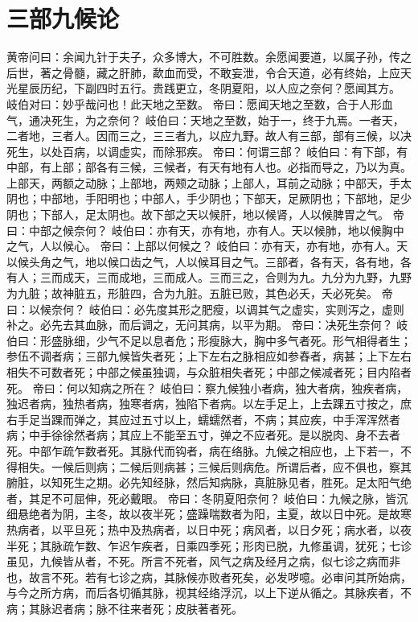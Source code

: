 \documentclass[a4paper,12pt,UTF8,twoside]{ctexbook}
\begin{document}
\chapter{三部九候论}
黄帝问曰：余闻九针于夫子，众多博大，不可胜数。余愿闻要道，以属子孙，传之后世，著之骨髓，藏之肝肺，歃血而受，不敢妄泄，令合天道，必有终始，上应天光星辰历纪，下副四时五行。贵践更立，冬阴夏阳，以人应之奈何？愿闻其方。
岐伯对曰：妙乎哉问也！此天地之至数。
帝曰：愿闻天地之至数，合于人形血气，通决死生，为之奈何？
岐伯曰：天地之至数，始于一，终于九焉。一者天，二者地，三者人。因而三之，三三者九，以应九野。故人有三部，部有三候，以决死生，以处百病，以调虚实，而除邪疾。
帝曰：何谓三部？
岐伯曰：有下部，有中部，有上部；部各有三候，三候者，有天有地有人也。必指而导之，乃以为真。上部天，两额之动脉；上部地，两颊之动脉；上部人，耳前之动脉；中部天，手太阴也；中部地，手阳明也；中部人，手少阴也；下部天，足厥阴也；下部地，足少阴也；下部人，足太阴也。故下部之天以候肝，地以候肾，人以候脾胃之气。
帝曰：中部之候奈何？
岐伯曰：亦有天，亦有地，亦有人。天以候肺，地以候胸中之气，人以候心。
帝曰：上部以何候之？
岐伯曰：亦有天，亦有地，亦有人。天以候头角之气，地以候口齿之气，人以候耳目之气。三部者，各有天，各有地，各有人；三而成天，三而成地，三而成人。三而三之，合则为九。九分为九野，九野为九脏；故神脏五，形脏四，合为九脏。五脏已败，其色必夭，夭必死矣。
帝曰：以候奈何？
岐伯曰：必先度其形之肥瘦，以调其气之虚实，实则泻之，虚则补之。必先去其血脉，而后调之，无问其病，以平为期。
帝曰：决死生奈何？
岐伯曰：形盛脉细，少气不足以息者危；形瘦脉大，胸中多气者死。形气相得者生；参伍不调者病；三部九候皆失者死；上下左右之脉相应如参舂者，病甚；上下左右相失不可数者死；中部之候虽独调，与众脏相失者死；中部之候减者死；目内陷者死。
帝曰：何以知病之所在？
岐伯曰：察九候独小者病，独大者病，独疾者病，独迟者病，独热者病，独寒者病，独陷下者病。以左手足上，上去踝五寸按之，庶右手足当踝而弹之，其应过五寸以上，蠕蠕然者，不病；其应疾，中手浑浑然者病；中手徐徐然者病；其应上不能至五寸，弹之不应者死。是以脱肉、身不去者死。中部乍疏乍数者死。其脉代而钩者，病在络脉。九候之相应也，上下若一，不得相失。一候后则病；二候后则病甚；三候后则病危。所谓后者，应不俱也，察其腑脏，以知死生之期。必先知经脉，然后知病脉，真脏脉见者，胜死。足太阳气绝者，其足不可屈伸，死必戴眼。
帝曰：冬阴夏阳奈何？
岐伯曰：九候之脉，皆沉细悬绝者为阴，主冬，故以夜半死；盛躁喘数者为阳，主夏，故以日中死。是故寒热病者，以平旦死；热中及热病者，以日中死；病风者，以日夕死；病水者，以夜半死；其脉疏乍数、乍迟乍疾者，日乘四季死；形肉已脱，九修虽调，犹死；七诊虽见，九候皆从者，不死。所言不死者，风气之病及经月之病，似七诊之病而非也，故言不死。若有七诊之病，其脉候亦败者死矣，必发哕噫。必审问其所始病，与今之所方病，而后各切循其脉，视其经络浮沉，以上下逆从循之。其脉疾者，不病；其脉迟者病；脉不往来者死；皮肤著者死。
\end{document}
